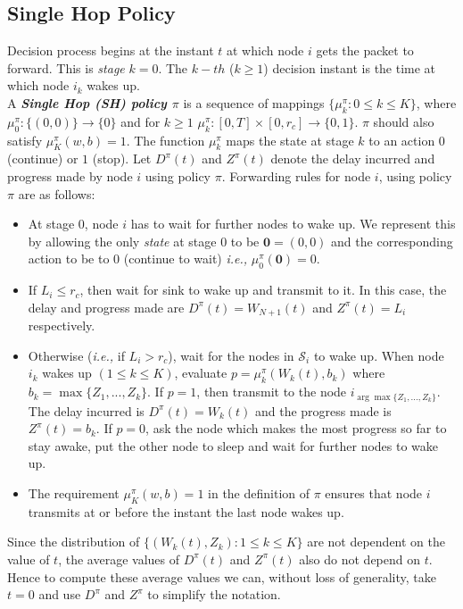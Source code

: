\documentclass[onecolumn]{IEEEtran}
\begin{document}
\subsection{Single Hop Policy}\label{policy_sec}
Decision process begins at the instant $t$ at which node $i$
gets the packet to forward. This is \emph{stage} $k=0$.  The $k-th$
($k\ge1$) decision instant is the time at which node $i_k$ wakes up.\\
A \emph{\textbf{Single Hop (SH) policy $\pi$}} is a sequence of
mappings $\{\mu_k^{\pi}:0\le k\le K\}$, where
$\mu_0^{\pi}:\{(0,0)\}\rightarrow \{0\}$ and for $ k\ge 1$
$\mu_k^{\pi}:{[0,T]\times[0,r_c]}\rightarrow \{0,1\}$. $\pi$ should
also satisfy $\mu_{K}^{\pi}(w,b)=1$. The function $\mu_{k}^{\pi}$
maps the state at stage $k$ to an action $0$ (continue) or $1$ (stop).  Let $D^{\pi}(t)$ and
$Z^{\pi}(t)$ denote the delay incurred and progress made by node $i$
using policy $\pi$.  Forwarding rules for node $i$, using policy $\pi$
are as follows:
\begin{itemize}
\item At stage $0$, node $i$ has to wait for further nodes to wake up.
  We represent this by allowing the only \emph{state} at stage $0$ to
  be $\textbf{0}=(0,0)$ and the corresponding action to be to $0$
  (continue to wait) \emph{i.e.,} $\mu^{\pi}_0(\textbf{0})=0$.
\item If $L_i\le r_c$, then wait for sink to wake up and transmit to
  it.  In this case, the delay and progress made are
  $D^{\pi}(t)=W_{N+1}(t)$ and $Z^{\pi}(t)=L_i$ respectively.
\item Otherwise (\emph{i.e.,} if $L_i>r_c$), wait for the nodes in
  $\mathcal{S}_i$ to wake up. When node $i_k$ wakes up $(1\le k\le
  K)$, evaluate $p=\mu_k^{\pi}(W_{k}(t),b_k)$ where $b_k=
  \max\{Z_{1},...,Z_{k}\}$. If $p=1$, then transmit to the node
  $i_{\arg\max\{Z_{1},...,Z_{k}\}}$. The delay incurred is
  $D^{\pi}(t)=W_{k}(t)$ and the progress made is $Z^{\pi}(t)=b_k$. If
  $p=0$, ask the node which makes the most progress so far to stay
  awake, put the other node to sleep and wait for further nodes to
  wake up.
\item The requirement $\mu_{K}^{\pi}(w,b)=1$ in the definition of
  $\pi$ ensures that node $i$ transmits at or before the instant the
  last node wakes up.
\end{itemize}

Since the distribution of $\{(W_{k}(t),Z_{k}) : 1\le k\le K\}$ are not
dependent on the value of $t$, the average values of $D^{\pi}(t)$ and
$Z^{\pi}(t)$ also do not depend on $t$. Hence to compute these average
values we can, without loss of generality, take $t=0$ and use
$D^{\pi}$ and $Z^{\pi}$ to simplify the notation.
\end{document}
